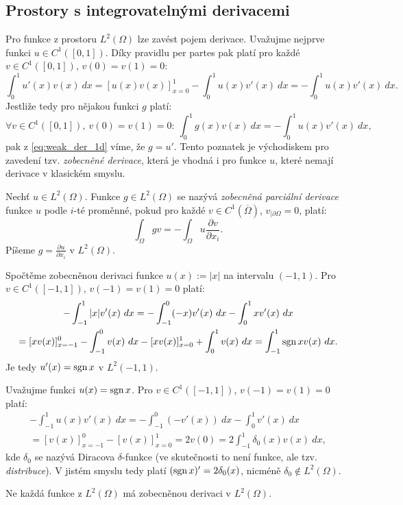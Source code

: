 \subsection{Prostory s integrovatelnými derivacemi}

Pro funkce z prostoru $L^2(\Omega)$ lze zavést pojem derivace.
Uvažujme nejprve funkci $u\in C^1([0,1])$.
Díky pravidlu per partes pak platí pro každé $v\in C^1([0,1])$, $v(0)=v(1)=0$:
\begin{equation}
\label{eq:weak_der_1d}
\int_0^1 u'(x)v(x)~dx = [u(x)v(x)]_{x=0}^1 - \int_0^1u(x)v'(x)~dx = - \int_0^1u(x)v'(x)~dx.
\end{equation}
Jestliže tedy pro nějakou funkci $g$ platí:
\[ \forall v\in C^1([0,1]),~v(0)=v(1)=0:~\int_0^1g(x)v(x)~dx=-\int_0^1 u(x)v'(x)~dx, \]
pak z \eqref{eq:weak_der_1d} víme, že $g=u'$.
Tento poznatek je východiskem pro zavedení tzv. \emph{zobecněné derivace}, která je vhodná i pro funkce $u$, které nemají derivace v klasickém smyslu.
\begin{df}
Nechť $u\in L^2(\Omega)$. Funkce $g\in L^2(\Omega)$ se nazývá \emph{zobecněná parciální derivace} funkce $u$ podle $i$-té proměnné, pokud pro každé $v\in C^1(\overline\Omega)$, $v_{|\partial\Omega}=0$, platí:
\[ \int_\Omega gv = -\int_{\Omega} u\frac{\partial v}{\partial x_i}. \]
Píšeme $g=\frac{\partial u}{\partial x_i}$ v $L^2(\Omega)$.
\end{df}
\begin{ex}
Spočtěme zobecněnou derivaci funkce $u(x):=|x|$ na intervalu $(-1,1)$.
Pro $v\in C^1([-1,1])$, $v(-1)=v(1)=0$ platí:
\begin{multline*}
-\int_{-1}^1|x|v'(x)~dx = -\int_{-1}^0(-x)v'(x)~dx - \int_0^1xv'(x)~dx\\
= [xv(x)]_{x=-1}^0 - \int_{-1}^0v(x)~dx - [xv(x)]_{x=0}^1 + \int_0^1v(x)~dx
= \int_{-1}^1\operatorname{sgn} x v(x)~dx.
\end{multline*}
Je tedy $u'(x)=\operatorname{sgn} x$ v $L^2(-1,1)$.
\end{ex}
\begin{ex}
Uvažujme funkci $u(x) = \operatorname{sgn} x$. Pro $v\in C^1([-1,1])$, $v(-1)=v(1)=0$ platí:
\begin{multline*}
 -\int_{-1}^1u(x)v'(x)~dx = -\int_{-1}^0 (-v'(x))~dx - \int_0^1 v'(x)~dx\\
 = [v(x)]_{x=-1}^0 - [v(x)]_{x=0}^1 = 2v(0) = 2\int_{-1}^1\delta_0(x)v(x)~dx,
\end{multline*}
kde $\delta_0$ se nazývá Diracova $\delta$-funkce (ve skutečnosti to není funkce, ale tzv. \emph{distribuce}). V jistém smyslu tedy platí $(\operatorname{sgn} x)'=2\delta_0(x)$, nicméně $\delta_0\notin L^2(\Omega)$.
\end{ex}
Ne každá funkce z $L^2(\Omega)$ má zobecněnou derivaci v $L^2(\Omega)$.

